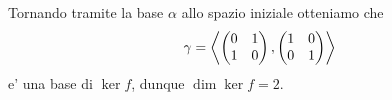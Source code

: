 \begin{solution}
\begin{enumerate}
        Tornando tramite la base $\alpha$ allo spazio iniziale otteniamo che \[
            \gamma = \left\langle \begin{pmatrix} 0 & 1 \\ 1 & 0 \end{pmatrix}, \begin{pmatrix} 1 & 0 \\ 0 & 1 \end{pmatrix} \right\rangle  
        \] e' una base di $\ker f$, dunque $\dim \ker f = 2$.
    \end{enumerate}
\end{solution}